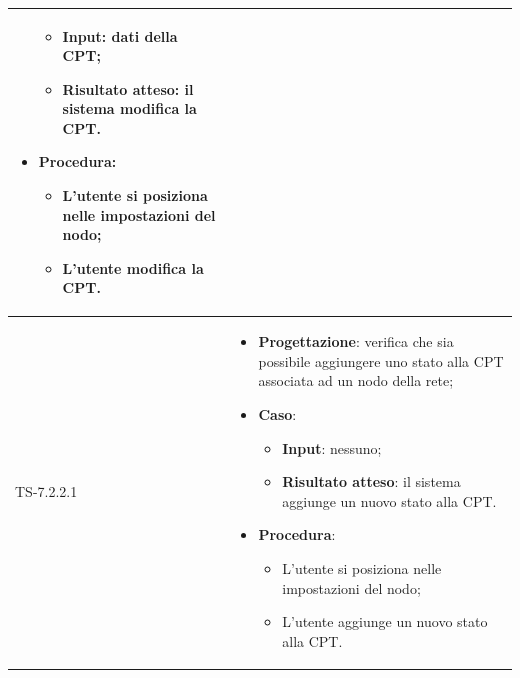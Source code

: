 \begin{longtable}{|C{2.5cm}|C{13cm}|}
\begin{itemize}
\begin{itemize}
		\item \textbf{Input}: dati della CPT;
		\item \textbf{Risultato atteso}: il sistema modifica la CPT.
	\end{itemize}
	\item \textbf{Procedura}:
	\begin{itemize}
		\item L'utente si posiziona nelle impostazioni del nodo;
		\item L'utente modifica la CPT.
	\end{itemize} 
\end{itemize}
	 \\
	\hline
	{TS-7.2.2.1} &
\begin{itemize}
	\item \textbf{Progettazione}: verifica che sia possibile aggiungere uno
	stato alla CPT associata ad un nodo della rete;
	\item \textbf{Caso}: 
	\begin{itemize}
		\item \textbf{Input}: nessuno;
		\item \textbf{Risultato atteso}: il sistema aggiunge un nuovo stato alla CPT.
	\end{itemize}
	\item \textbf{Procedura}:
	\begin{itemize}
		\item L'utente si posiziona nelle impostazioni del nodo;
		\item L'utente aggiunge un nuovo stato alla CPT.
	\end{itemize} 
\end{itemize}
	 

\end{longtable}
